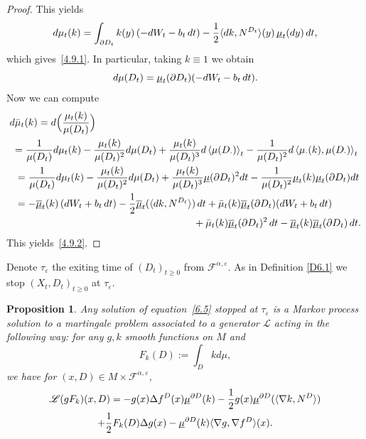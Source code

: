 \documentclass[JEP,XML,SOM,Unicode,NoFloatCountersInSection,published]{cedram}
\theoremstyle{plain}
\newtheorem{prop}[thm]{Proposition}
\theoremstyle{definition}
\newcommand{\SL}{{\mathscr L}}
\newcommand{\lan}{\lt\langle}
\newcommand{\ran}{\rt\rangle}
\newcommand{\lt}{\left}
\newcommand{\rt}{\right}
\newcommand{\usm}{{\underline{\smash{\mu}}}}
\newcommand{\usbm}{{\underline{\smash{\overline\mu}}}}
\let\f\frac
\let\a\alpha
\let\e\varepsilon
\let\n\nabla
\newcommand{\cF}{\mathcal{F}}
\begin{document}
\begin{proof}
This yields
\begin{equation}
d\mu_t(k)=\int_{\partial D_t}{k}(y)\left(-dW_t-b_t\,dt\right)-\f12 \langle dk,N^{D_t}\rangle(y)\,\usm_{{t}}(dy)\,dt,
\end{equation}
which gives~\eqref{4.9.1}.
In particular, taking $k \equiv 1$ we obtain
\begin{equation}
\label{4.19}
d\mu(D_t)=\usm_t(\partial D_t)(-dW_t -b_t\,dt).
\end{equation}
Now we can compute
\begin{align*}
d&\bar\mu_t(k)=d\Bigl(\f{\mu_t(k)}{\mu(D_t)}\Bigr)\\
&{=\f1{\mu(D_t)}d\mu_t(k)-\f{\mu_t(k)}{\mu(D_t)^2}d\mu(D_t)+\f{\mu_t(k)}{\mu(D_t)^3}d\lan\mu(D_\cdot)\ran_t
-\f1{\mu(D_t)^2}d\lan \mu_\cdot(k),\mu(D_\cdot)\ran_t}\\
&=\f1{\mu(D_t)}d\mu_t(k)-\f{\mu_t(k)}{\mu(D_t)^2}d\mu(D_t)+\f{\mu_t(k)}{\mu(D_t)^3}\usm(\partial D_t)^2dt-\f{1}{\mu(D_t)^2}\usm_t(k)\usm_t(\partial D_t)dt\\
&=-\usbm_t(k)\left(dW_t+b_t\,dt\right)-\f12\usbm_t(\langle dk,N^{D_t}\rangle )\,dt+\bar\mu_t(k)\usbm_t(\partial D_t)(dW_t+b_t\,dt)\\
&\hspace*{6.3cm}+\bar\mu_t(k)\usbm_t(\partial D_t)^2\,dt
-\usbm_t(k)\usbm_t(\partial D_t)\,dt.
\end{align*}
This yields~\eqref{4.9.2}.
\end{proof}
\par
Denote $\tau_\e$ the exiting time of $(D_t)_{t\geq 0}$ from $\cF^{\a,\e}$.
As in Definition \ref{D6.1} we stop $(X_t,D_t)_{t\geq 0}$ at $\tau_\e$.
\begin{prop}
\label{P6.1}
Any solution of equation~\eqref{6.5} stopped at $\tau_\e$ is a Markov process solution to a martingale problem associated to a generator $\SL$ acting in the following way: for any $g,k$ smooth functions on $M$ and
\begin{equation}
F_k (D):=\int_Dkd\mu,
\end{equation}
we have for $(x,D)\in M\times\cF^{\a,\e}$,
\begin{multline}
\label{6.14}
\SL(gF_k)(x,D)=-g(x)\Delta f^D(x)\usm^{\partial D}(k)-\f12 g(x)\usm^{\partial D}(\langle \n k, N^D\rangle)\\
+\f12 F_k(D)\Delta g(x)-\usm^{\partial D}(k)\langle\n g, \n f^D\rangle (x).
\end{multline}
\end{prop}
\end{document}
